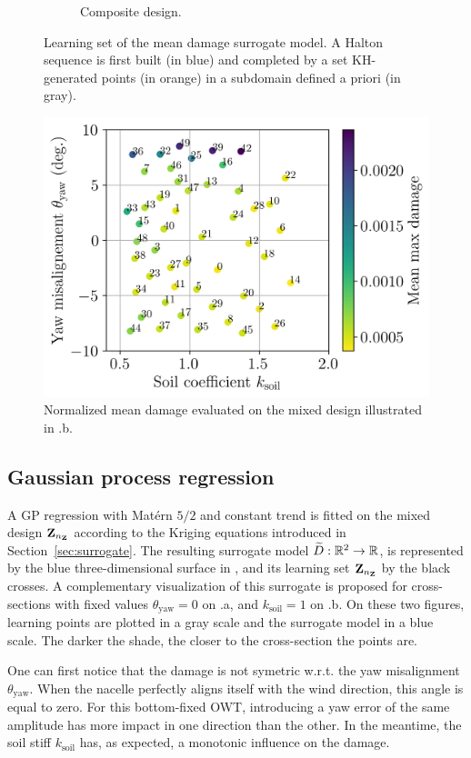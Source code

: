 \begin{figure}
\begin{subfigure}{0.48\linewidth}
        \caption{Composite design.}
    \end{subfigure}
    \caption{Learning set of the mean damage surrogate model. A Halton sequence is first built (in blue) and completed by a set KH-generated points (in orange) in a subdomain defined a priori (in gray).}
    \label{fig:initial_doe}
\end{figure}

\begin{figure}[h!]
    \centering
    \includegraphics[width=0.6\linewidth]{./part3/figures/OWT/normalized_results_mean.png}
    \caption{Normalized mean damage evaluated on the mixed design illustrated in .b.}
    \label{fig:evaluated_doe}
\end{figure}


\subsection{Gaussian process regression}\label{sec:gp_owt}
A GP regression with Matérn $5/2$ and constant trend is fitted on the mixed design ${\bf Z}_{n_{\bf Z}}$ according to the Kriging equations introduced in Section~\ref{sec:surrogate}. 
The resulting surrogate model $\widetilde{D}:\mathbb{R}^2 \rightarrow \mathbb{R}$, is represented by the blue three-dimensional surface in , and its learning set  ${\bf Z}_{n_{\bf Z}}$ by the black crosses.  
A complementary visualization of this surrogate is proposed for cross-sections with fixed values $\theta_{\mathrm{yaw}}=0$ on .a, and $k_{\mathrm{soil}}=1$ on .b. 
On these two figures, learning points are plotted in a gray scale and the surrogate model in a blue scale. 
The darker the shade, the closer to the cross-section the points are. 

One can first notice that the damage is not symetric w.r.t. the yaw misalignment $\theta_{\mathrm{yaw}}$. 
When the nacelle perfectly aligns itself with the wind direction, this angle is equal to zero. 
For this bottom-fixed OWT, introducing a yaw error of the same amplitude has more impact in one direction than the other. 
In the meantime, the soil stiff $k_{\mathrm{soil}}$ has, as expected, a monotonic influence on the damage. 

